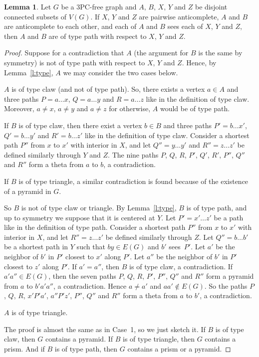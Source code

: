 \documentclass[11pt]{article}
\theoremstyle{definition}
\newtheorem{lemma}[theorem]{Lemma}
\theoremstyle{definition}
\begin{document}
\begin{lemma}
  \label{l:OnePath}
  Let $G$ be a 3PC-free graph and $A$, $B$, $X$, $Y$ and $Z$ be
  disjoint connected subsets of $V(G)$. If $X$, $Y$ and $Z$ are
  pairwise anticomplete, $A$ and $B$ are anticomplete to each other,
  and each of $A$ and $B$ sees each of $X$, $Y$ and $Z$, then $A$ and $B$ are
  of type path with respect to $X$, $Y$ and $Z$.
\end{lemma}

\begin{proof}
  Suppose for a contradiction that $A$ (the argument for $B$ is the same by symmetry) is not of type path with
  respect to $X$, $Y$ and $Z$.  Hence, by Lemma~\ref{l:type}, $A$ we
  may consider the two cases below.

   $A$ is of type claw (and not of type path).  So, there
  exists a vertex $a\in A$ and three paths $P = a\dots x$,
  $Q = a\dots y$ and $R= a\dots z$ like in the definition of type
  claw.  Moreover, $a\neq x$, $a\neq y$ and $a\neq z$ for otherwise,
  $A$ would be of type path.

  If $B$ is of type claw, then there exist a vertex $b\in B$ and
  three paths $P' = b\dots x'$, $Q' = b\dots y'$ and $R'= b\dots z'$
  like in the definition of type claw. Consider a shortest path $P''$
  from $x$ to $x'$ with interior in $X$, and let $Q'' = y\dots y'$ and
  $R'' = z \dots z'$ be defined similarly through $Y$ and $Z$.  The
  nine paths $P$, $Q$, $R$, $P'$, $Q'$, $R'$, $P''$, $Q''$ and $R''$
  form a theta from $a$ to $b$, a contradiction.

  If $B$ is of type triangle, a similar contradiction is found because
  of the existence of a pyramid in $G$. 

  So $B$ is not of type claw or triangle.  By Lemma~\ref{l:type}, $B$
  is of type path, and up to symmetry we suppose that it is centered
  at $Y$.  Let $P' = x' \dots z'$ be a path like in the definition of
  type path. Consider a shortest path $P''$ from $x$ to $x'$ with
  interior in $X$, and let $R'' = z \dots z'$ be defined similarly
  through $Z$.  Let $Q''=b\dots b'$ be a shortest path in $Y$ such
  that $by\in E(G)$ and $b'$ sees~$P'$.  Let $a'$ be the neighbor of
  $b'$ in $P'$ closest to $x'$ along $P'$. Let $a''$ be the neighbor
  of $b'$ in $P'$ closest to $z'$ along $P'$.  If $a'=a''$, then $B$
  is of type claw, a contradiction.  If $a'a''\in E(G)$, then the
  seven paths $P$, $Q$, $R$, $P'$, $P''$, $Q''$ and $R''$ form a
  pyramid from $a$ to $b'a'a''$, a contradiction.  Hence $a\neq a'$
  and $aa'\notin E(G)$.  So the paths $P$, $Q$, $R$, $x'P'a'$,
  $a''P'z'$, $P''$, $Q''$ and $R''$ form a theta from $a$ to $b'$, a
  contradiction.


   $A$ is of type triangle.

  The proof is almost the same as in Case~1, so we just sketch it.  If
  $B$ is of type claw, then $G$ contains a pyramid. If $B$ is of type
  triangle, then $G$ contains a prism. And if $B$ is of type path,
  then $G$ contains a prism or a pyramid.   
\end{proof}
\end{document}
